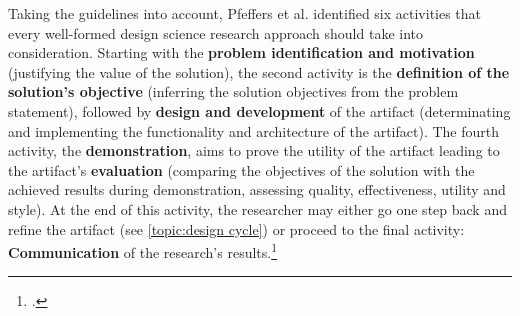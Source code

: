 
Taking the guidelines into account, Pfeffers et al. identified six activities that every well-formed design science research approach should take into consideration. Starting with the \textbf{problem identification and motivation} (justifying the value of the solution), the second activity is the \textbf{definition of the solution's objective} (inferring the solution objectives from the problem statement), followed by \textbf{design and development} of the artifact (determinating and implementing the functionality and architecture of the artifact). The fourth activity, the \textbf{demonstration}, aims to prove the utility of the artifact leading to the artifact's \textbf{evaluation} (comparing the objectives of the solution with the achieved results during demonstration, assessing quality, effectiveness, utility and style). At the end of this activity, the researcher may either go one step back and refine the artifact (see \ref{topic:design cycle}) or proceed to the final activity: \textbf{Communication} of the research's results.\footcite[Cf.][pp.12 et seq]{PfeffersDesignScienceResearch2007}



